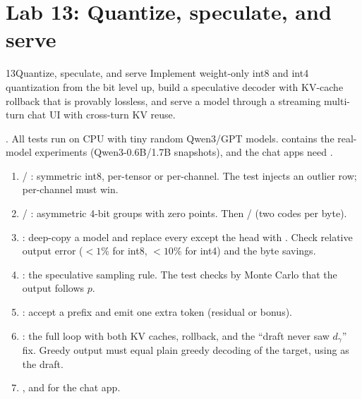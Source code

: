 \section{Lab 13: Quantize, speculate, and serve}\label{sec:efficient:lab}
\begin{labbox}{13}{Quantize, speculate, and serve}
Implement weight-only int8 and int4 quantization from the bit level up, build a
speculative decoder with KV-cache rollback that is provably lossless, and serve a model
through a streaming multi-turn chat UI with cross-turn KV reuse.

. All
tests run on CPU with tiny random Qwen3/GPT models.  contains the
real-model experiments (Qwen3-0.6B/1.7B snapshots), and the chat apps need
.

\begin{enumerate}
  \item {} / : symmetric int8, per-tensor or
        per-channel. The test injects an outlier row; per-channel must win.
  \item {} / : asymmetric 4-bit groups
        with zero points. Then  /  (two codes per byte).
  \item {}: deep-copy a model and replace every
         except the head with . Check relative
        output error ($<1\%$ for int8, $<10\%$ for int4) and the byte savings.
  \item {}: the speculative sampling rule. The test checks by
        Monte Carlo that the output follows $p$.
  \item {}: accept a prefix and emit one extra token (residual or bonus).
  \item {}: the full loop with both KV caches, rollback, and
        the ``draft never saw $d_\gamma$'' fix. Greedy output must equal plain greedy
        decoding of the target, using  as the draft.
  \item {}, and  for the chat app.
\end{enumerate}


\end{labbox}
